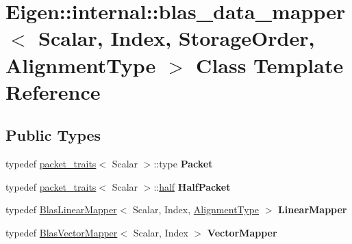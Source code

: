 \hypertarget{class_eigen_1_1internal_1_1blas__data__mapper}{}\section{Eigen\+::internal\+::blas\+\_\+data\+\_\+mapper$<$ Scalar, Index, Storage\+Order, Alignment\+Type $>$ Class Template Reference}
\label{class_eigen_1_1internal_1_1blas__data__mapper}
\subsection*{Public Types}
\begin{DoxyCompactItemize}
\item 
\mbox{\label{class_eigen_1_1internal_1_1blas__data__mapper_a6b3a9094d6d25aaecebb80ea9d0cd802}} 
typedef \mbox{\hyperlink{struct_eigen_1_1internal_1_1packet__traits}{packet\+\_\+traits}}$<$ Scalar $>$\+::type {\bfseries Packet}
\item 
\mbox{\label{class_eigen_1_1internal_1_1blas__data__mapper_a2a7e2cc9f49b1328b3c730a4ea94dda0}} 
typedef \mbox{\hyperlink{struct_eigen_1_1internal_1_1packet__traits}{packet\+\_\+traits}}$<$ Scalar $>$\+::\mbox{\hyperlink{struct_eigen_1_1half}{half}} {\bfseries Half\+Packet}
\item 
\mbox{\label{class_eigen_1_1internal_1_1blas__data__mapper_a6ece4295a96eb25888a84b66d74ecea1}} 
typedef \mbox{\hyperlink{class_eigen_1_1internal_1_1_blas_linear_mapper}{Blas\+Linear\+Mapper}}$<$ Scalar, Index, \mbox{\hyperlink{group__enums_ga45fe06e29902b7a2773de05ba27b47a1}{Alignment\+Type}} $>$ {\bfseries Linear\+Mapper}
\item 
\mbox{\label{class_eigen_1_1internal_1_1blas__data__mapper_a6af2e5b42bf8920514caed0900e136ea}} 
typedef \mbox{\hyperlink{class_eigen_1_1internal_1_1_blas_vector_mapper}{Blas\+Vector\+Mapper}}$<$ Scalar, Index $>$ {\bfseries Vector\+Mapper}
\end{DoxyCompactItemize}
